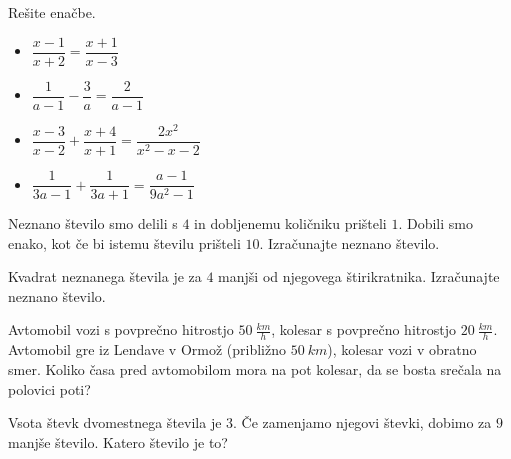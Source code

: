 ~~\\~~\\
        
            \begin{naloga}
                Rešite enačbe.
                \begin{itemize}
                        \item $\dfrac{x-1}{x+2}=\dfrac{x+1}{x-3}$ 
                        \item $\dfrac{1}{a-1}-\dfrac{3}{a}=\dfrac{2}{a-1}$ 
                        \item $\dfrac{x-3}{x-2}+\dfrac{x+4}{x+1}=\dfrac{2x^2}{x^2-x-2}$ 
                        \item $\dfrac{1}{3a-1}+\dfrac{1}{3a+1}=\dfrac{a-1}{9a^2-1}$ 
                \end{itemize}
            \end{naloga}
        


        
            \begin{naloga}
                Neznano število smo delili s $4$ in dobljenemu količniku prišteli $1$. 
                Dobili smo enako, kot če bi istemu številu prišteli $10$. Izračunajte neznano število.
                
            \end{naloga}

            \begin{naloga}
                Kvadrat neznanega števila je za $4$ manjši od njegovega štirikratnika. Izračunajte neznano število.
                
            \end{naloga}

        


        
            \begin{naloga}
                Avtomobil vozi s povprečno hitrostjo $50~\frac{km}{h}$, kolesar s povprečno hitrostjo $20~\frac{km}{h}$.
                Avtomobil gre iz Lendave v Ormož (približno $50~km$), kolesar vozi v obratno smer. 
                Koliko časa pred avtomobilom mora na pot kolesar, da se bosta srečala na polovici poti?
                
            \end{naloga}

            \begin{naloga}
                Vsota števk dvomestnega števila je $3$. Če zamenjamo njegovi števki, dobimo za $9$ manjše število. Katero število je to?
                
            \end{naloga}


